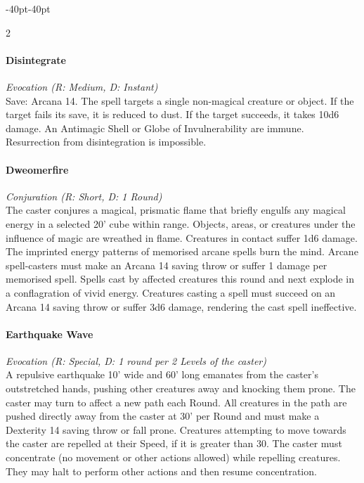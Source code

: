 \documentclass{book}
\begin{document}
\begin{adjustwidth}{-40pt}{-40pt}
\begin{multicols}{2}
\paragraph{Disintegrate}\label{disintegrate}

\emph{Evocation (R: Medium, D: Instant)}\\
Save: Arcana 14. The spell targets a single non-magical creature or
object. If the target fails its save, it is reduced to dust. If the
target succeeds, it takes 10d6 damage. An Antimagic Shell or Globe of
Invulnerability are immune. Resurrection from disintegration is
impossible.

\paragraph{Dweomerfire}\label{dweomerfire}

\emph{Conjuration (R: Short, D: 1 Round)}\\
The caster conjures a magical, prismatic flame that briefly engulfs any
magical energy in a selected 20' cube within range. Objects, areas, or
creatures under the influence of magic are wreathed in flame. Creatures
in contact suffer 1d6 damage. The imprinted energy patterns of memorised
arcane spells burn the mind. Arcane spell-casters must make an Arcana 14
saving throw or suffer 1 damage per memorised spell. Spells cast by
affected creatures this round and next explode in a conflagration of
vivid energy. Creatures casting a spell must succeed on an Arcana 14
saving throw or suffer 3d6 damage, rendering the cast spell ineffective.

\paragraph{Earthquake Wave}\label{earthquake-wave}

\emph{Evocation (R: Special, D: 1 round per 2 Levels of the caster)}\\
A repulsive earthquake 10' wide and 60' long emanates from the caster's
outstretched hands, pushing other creatures away and knocking them
prone. The caster may turn to affect a new path each Round. All
creatures in the path are pushed directly away from the caster at 30'
per Round and must make a Dexterity 14 saving throw or fall prone.
Creatures attempting to move towards the caster are repelled at their
Speed, if it is greater than 30. The caster must concentrate (no
movement or other actions allowed) while repelling creatures. They may
halt to perform other actions and then resume concentration.


\end{multicols}
\end{adjustwidth}
\end{document}

